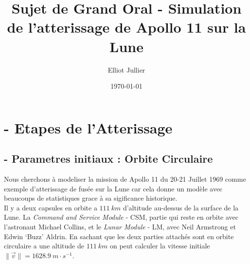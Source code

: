 \documentclass[a4paper, 12pt]{scrartcl}
\begin{document}
\title{Sujet de Grand Oral - Simulation de l'atterissage de Apollo 11 sur la Lune }
\author{Elliot Jullier}
\date{\today}
\maketitle

\tableofcontents

\newpage
{}




\section{- Etapes de l'Atterissage}
\subsection{- Parametres initiaux : Orbite Circulaire}
Nous cherchons à modeliser la mission de Apollo 11 du 20-21 Juillet 1969 comme exemple d'atterissage
de fusée sur la Lune car cela donne un modèle avec beaucoups de statistiques grace à sa sigificance 
historique. 
\\
Il y a deux capsules en orbite a $111\ km$ d'altitude au-dessus de la surface de la Lune. La \emph{Command and Service Module} - CSM,
partie qui reste en orbite avec l'astronaut Michael Collins, et le \emph{Lunar Module} - LM, avec Neil Armstrong et Edwin `Buzz' Aldrin.
En sachant que les deux parties attachés sont en orbite circulaire a une altitude de $111\ km$ on peut calculer
la vitesse initiale $\| \overrightarrow{v} \| = 1628.9\ m\cdot s^{-1}$. 
\end{document}
